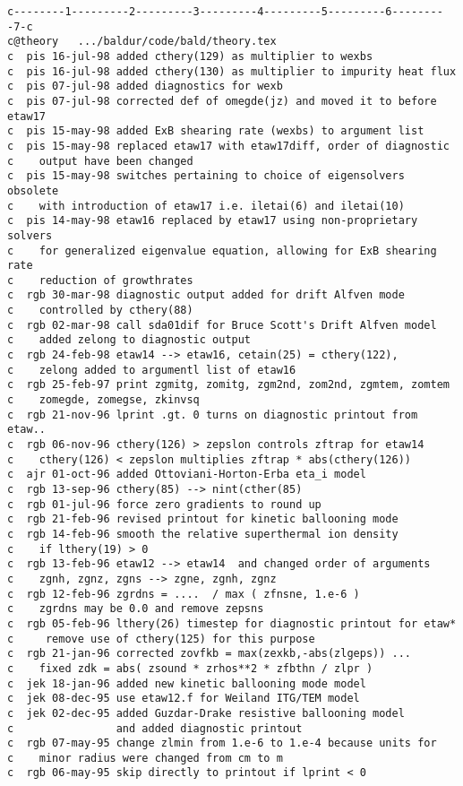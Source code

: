 \begin{verbatim}
c--------1---------2---------3---------4---------5---------6---------7-c
c@theory   .../baldur/code/bald/theory.tex
c  pis 16-jul-98 added cthery(129) as multiplier to wexbs
c  pis 16-jul-98 added cthery(130) as multiplier to impurity heat flux
c  pis 07-jul-98 added diagnostics for wexb
c  pis 07-jul-98 corrected def of omegde(jz) and moved it to before etaw17
c  pis 15-may-98 added ExB shearing rate (wexbs) to argument list
c  pis 15-may-98 replaced etaw17 with etaw17diff, order of diagnostic 
c    output have been changed
c  pis 15-may-98 switches pertaining to choice of eigensolvers obsolete 
c    with introduction of etaw17 i.e. iletai(6) and iletai(10)
c  pis 14-may-98 etaw16 replaced by etaw17 using non-proprietary solvers 
c    for generalized eigenvalue equation, allowing for ExB shearing rate 
c    reduction of growthrates
c  rgb 30-mar-98 diagnostic output added for drift Alfven mode
c    controlled by cthery(88)
c  rgb 02-mar-98 call sda01dif for Bruce Scott's Drift Alfven model
c    added zelong to diagnostic output
c  rgb 24-feb-98 etaw14 --> etaw16, cetain(25) = cthery(122), 
c    zelong added to argumentl list of etaw16
c  rgb 25-feb-97 print zgmitg, zomitg, zgm2nd, zom2nd, zgmtem, zomtem
c    zomegde, zomegse, zkinvsq
c  rgb 21-nov-96 lprint .gt. 0 turns on diagnostic printout from etaw..
c  rgb 06-nov-96 cthery(126) > zepslon controls zftrap for etaw14
c    cthery(126) < zepslon multiplies zftrap * abs(cthery(126))
c  ajr 01-oct-96 added Ottoviani-Horton-Erba eta_i model
c  rgb 13-sep-96 cthery(85) --> nint(cther(85)
c  rgb 01-jul-96 force zero gradients to round up
c  rgb 21-feb-96 revised printout for kinetic ballooning mode
c  rgb 14-feb-96 smooth the relative superthermal ion density
c    if lthery(19) > 0
c  rgb 13-feb-96 etaw12 --> etaw14  and changed order of arguments
c    zgnh, zgnz, zgns --> zgne, zgnh, zgnz
c  rgb 12-feb-96 zgrdns = ....  / max ( zfnsne, 1.e-6 )
c    zgrdns may be 0.0 and remove zepsns
c  rgb 05-feb-96 lthery(26) timestep for diagnostic printout for etaw*
c     remove use of cthery(125) for this purpose
c  rgb 21-jan-96 corrected zovfkb = max(zexkb,-abs(zlgeps)) ...
c    fixed zdk = abs( zsound * zrhos**2 * zfbthn / zlpr )
c  jek 18-jan-96 added new kinetic ballooning mode model
c  jek 08-dec-95 use etaw12.f for Weiland ITG/TEM model
c  jek 02-dec-95 added Guzdar-Drake resistive ballooning model
c                and added diagnostic printout
c  rgb 07-may-95 change zlmin from 1.e-6 to 1.e-4 because units for
c    minor radius were changed from cm to m
c  rgb 06-may-95 skip directly to printout if lprint < 0

\end{verbatim}
